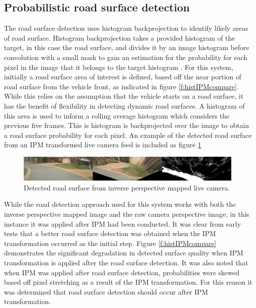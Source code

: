 \documentclass[]{aiaa-tc}%
\begin{document}
\subsection{Probabilistic road surface detection}\label{s:histogramRoadDetection}

The road surface detection uses histogram backprojection to identify likely areas of road surface. Histogram backprojection takes a provided histogram of the target, in this case the road surface, and divides it by an image histogram before convolution with a small mask to gain an estimation for the probability for each pixel in the image that it belongs to the target histogram \citep{histBackImageIndexing}. For this system, initially a road surface area of interest is defined, based off the near portion of road surface from the vehicle front, as indicated in figure \ref{f:histIPMcompare}. While this relies on the assumption that the vehicle starts on a road surface, it has the benefit of flexibility in detecting dynamic road surfaces. A histogram of this area is used to inform a rolling average histogram which considers the previous five frames. This is histogram is backprojected over the image to obtain a road surface probability for each pixel. An example of the detected road surface from an IPM transformed live camera feed is included as figure \ref{f:histRoadLive}


\begin{figure}
	\includegraphics[width=0.99\textwidth]{RoadDetection/histRoadLive.png}
	\caption{Detected road surface from inverse perspective mapped live camera.}
	\label{f:histRoadLive}
\end{figure}

While the road detection approach used for this system works with both the inverse perspective mapped image and the raw camera perspective image, in this instance it was applied after IPM had been conducted. It was clear from early tests that a better road surface detection was obtained when the IPM transformation occurred as the initial step. Figure \ref{f:histIPMcompare} demonstrates the significant degradation in detected surface quality when IPM transformation is applied after the road surface detection. It was also noted that when IPM was applied after road surface detection, probabilities were skewed based off pixel stretching as a result of the IPM transformation. For this reason it was determined that road surface detection should occur after IPM transformation.
\end{document}
